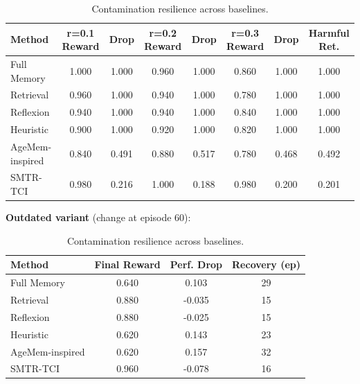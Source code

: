 \begin{table}[t]
\caption{Contamination resilience across baselines.}
\label{tab:contamination_baseline}
\centering
\begin{tabular}{l c c c c c c c}
\toprule
Method & r=0.1 Reward & Drop & r=0.2 Reward & Drop & r=0.3 Reward & Drop & Harmful Ret. \\
\midrule
Full Memory & 1.000 & 1.000 & 0.960 & 1.000 & 0.860 & 1.000 & 1.000 \\
Retrieval & 0.960 & 1.000 & 0.940 & 1.000 & 0.780 & 1.000 & 1.000 \\
Reflexion & 0.940 & 1.000 & 0.940 & 1.000 & 0.840 & 1.000 & 1.000 \\
Heuristic & 0.900 & 1.000 & 0.920 & 1.000 & 0.820 & 1.000 & 1.000 \\
AgeMem-inspired & 0.840 & 0.491 & 0.880 & 0.517 & 0.780 & 0.468 & 0.492 \\
SMTR-TCI & 0.980 & 0.216 & 1.000 & 0.188 & 0.980 & 0.200 & 0.201 \\
\bottomrule
\end{tabular}
\vspace{4pt}
\textbf{Outdated variant} (change at episode 60):
\begin{tabular}{l c c c}
\toprule
Method & Final Reward & Perf. Drop & Recovery (ep) \\
\midrule
Full Memory & 0.640 & 0.103 & 29 \\
Retrieval & 0.880 & -0.035 & 15 \\
Reflexion & 0.880 & -0.025 & 15 \\
Heuristic & 0.620 & 0.143 & 23 \\
AgeMem-inspired & 0.620 & 0.157 & 32 \\
SMTR-TCI & 0.960 & -0.078 & 16 \\
\bottomrule
\end{tabular}
\end{table}
